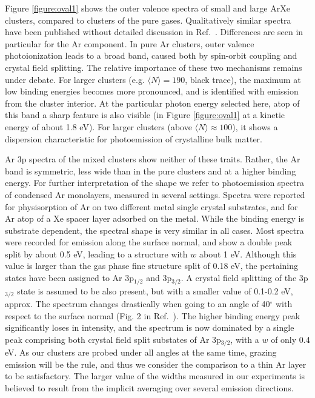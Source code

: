 Figure \ref{figure:oval1} shows the outer valence spectra of small and large ArXe clusters, compared to clusters of the pure gases. 
Qualitatively similar spectra have been published without detailed discussion in Ref.\ .
Differences are seen in particular for the Ar component. 
In pure Ar clusters, outer valence photoionization leads to a broad band, caused both by spin-orbit coupling and crystal field splitting. 
The relative importance of these two mechanisms remains under debate.\cite{hergenhahnprb,rolles,foerstel_arg1_2010} 
For larger clusters (e.g. $\langle N\rangle = 190$, black trace), the maximum at low binding energies becomes more pronounced, and is identified with emission from the cluster interior.\cite{hergenhahnprb,rolles}
At the particular photon energy selected here, atop of this band a sharp feature is also visible (in Figure \ref{figure:oval1} at a kinetic energy of about 1.8 eV). 
For larger clusters (above $\langle N\rangle \approx 100$), it shows a dispersion characteristic for photoemission of crystalline bulk matter.\cite{foerstel_arg1_2010,foerstel_arg2_2011} 

Ar 3p spectra of the mixed clusters show neither of these traits.
Rather, the Ar band is symmetric, less wide than in the pure clusters and at a higher binding energy. 
For further interpretation of the shape we refer to photoemission spectra of condensed Ar monolayers, measured in several settings.\cite{jacobi,jacobi2}
Spectra were reported for physisorption of Ar on two different metal single crystal substrates, and for Ar atop of a Xe spacer layer adsorbed on the metal.
While the binding energy is substrate dependent, the spectral shape is very similar in all cases. 
Most spectra were recorded for emission along the surface normal, and show a double peak split by about 0.5 eV, leading to a structure with $w$ about 1 eV.
Although this value is larger than the gas phase fine structure split of 0.18 eV, the pertaining states have been assigned to Ar 3p$_{1/2}$ and 3p$_{3/2}$.
A crystal field splitting of the 3p$_{3/2}$ state is assumed to be also present, but with a smaller value of 0.1-0.2 eV, approx.\cite{jacobi2} 
The spectrum changes drastically when going to an angle of 40$^\circ$ with respect to the surface normal (Fig. 2 in Ref.\ ).
The higher binding energy peak significantly loses in intensity, and the spectrum is now dominated by a single peak comprising both crystal field split substates of Ar 3p$_{3/2}$, with a $w$ of only 0.4 eV.
As our clusters are probed under all angles at the same time, grazing emission will be the rule, and thus we consider the comparison to a thin Ar layer to be satisfactory. 
The larger value of the widths measured in our experiments is believed to result from the implicit averaging over several emission directions.

